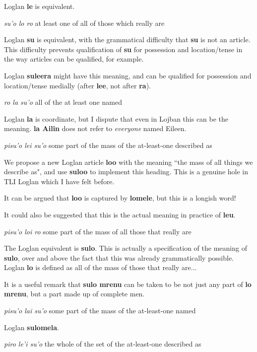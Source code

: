 \documentclass[12pt]{book}
\begin{document}
{\begin{description}
Loglan {\bf le} is equivalent.

\item[lo: ]	{\em su'o lo ro \/}	at least one of all of those which really are

Loglan {\bf su\/} is equivalent, with the grammatical difficulty that {\bf su\/} is not an article.  This difficulty prevents
qualification of {\bf su} for possession and location/tense in the way articles can be qualified, for example.

Loglan {\bf suleera} might have this meaning, and can be qualified for possession and location/tense medially (after {\bf lee}, not after {\bf ra}).

\item[la: ]	{\em ro la su'o \/}	all of the at least one named

Loglan {\bf la} is coordinate, but I dispute that even in Lojban this can be the meaning.  {\bf la Ailin} does not refer to {\em everyone\/} named Eileen.

\item[lei: ]	{\em pisu'o lei su'o \/}	some part of the mass of the at-least-one described as

We propose a new Loglan article {\bf loo} with the meaning ``the mass of all things we describe as", and use {\bf suloo} to implement this heading.  This is a genuine hole in TLI Loglan which I have felt before.

It can be argued that {\bf loo} is captured by {\bf lomele}, but this is a longish word!

It could also be suggested that this is the actual meaning in practice of {\bf leu}.

\item[loi: ]	{\em pisu'o loi ro\/} 	some part of the mass of all those that really are

The Loglan equivalent is {\bf sulo}.  This is actually a specification of the meaning of {\bf sulo}, over and above the fact that this was already grammatically possible.  Loglan {\bf lo} is defined as all of the mass of those that really are...

It is a useful remark that {\bf sulo mrenu} can be taken to be not just any part of {\bf lo mrenu}, but a part made up of complete men.

\item[lai: ]	{\em pisu'o lai su'o \/}	some part of the mass of the at-least-one named

Loglan {\bf sulomela}.

\item[le'i: ]	{\em piro le'i su'o \/}	the whole of the set of the at-least-one described as


\end{description}}
\end{document}
